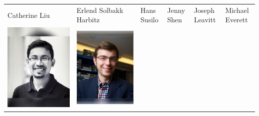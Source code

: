 \documentclass[landscape,a0paper,fontscale=0.292]{baposter}
\begin{document}
\begin{poster}
{\begin{center}
\begin{tabularx}{\linewidth}{X X X X X X}
{\tiny \centering Catherine Liu }& {\tiny \centering Erlend Solbakk Harbitz }& {\tiny \centering Hans Susilo }& {\tiny \centering Jenny Shen }& {\tiny \centering Joseph Leavitt }& {\tiny \centering Michael Everett }\\ 
 {\centering \includegraphics[width=0.6\linewidth]{mrinal.jpg}}&
{\centering \includegraphics[width=0.6\linewidth]{npd22.jpg}}&

\end{tabularx}
\end{center}}
\end{poster}
\end{document}
